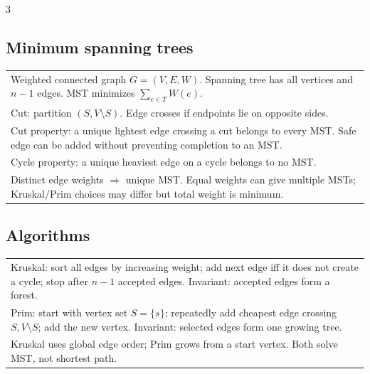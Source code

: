 \documentclass[10pt]{article}
\begin{document}
\begin{multicols*}{3}
\subsection*{Minimum spanning trees}
\begin{tabular}{@{}p{}@{}}
Weighted connected graph \(G=(V,E,W)\). Spanning tree has all vertices and \(n-1\) edges. MST minimizes \(\sum_{e\in T}W(e)\).\\
Cut: partition \((S,V\setminus S)\). Edge crosses if endpoints lie on opposite sides.\\
Cut property: a unique lightest edge crossing a cut belongs to every MST. Safe edge can be added without preventing completion to an MST.\\
Cycle property: a unique heaviest edge on a cycle belongs to no MST.\\
Distinct edge weights \(\Rightarrow\) unique MST. Equal weights can give multiple MSTs; Kruskal/Prim choices may differ but total weight is minimum.\\
\end{tabular}

\subsection*{Algorithms}
\begin{tabular}{@{}p{}@{}}
Kruskal: sort all edges by increasing weight; add next edge iff it does not create a cycle; stop after \(n-1\) accepted edges. Invariant: accepted edges form a forest.\\
Prim: start with vertex set \(S=\{s\}\); repeatedly add cheapest edge crossing \(S,V\setminus S\); add the new vertex. Invariant: selected edges form one growing tree.\\
Kruskal uses global edge order; Prim grows from a start vertex. Both solve MST, not shortest path.\\
\end{tabular}


\end{multicols*}
\end{document}

